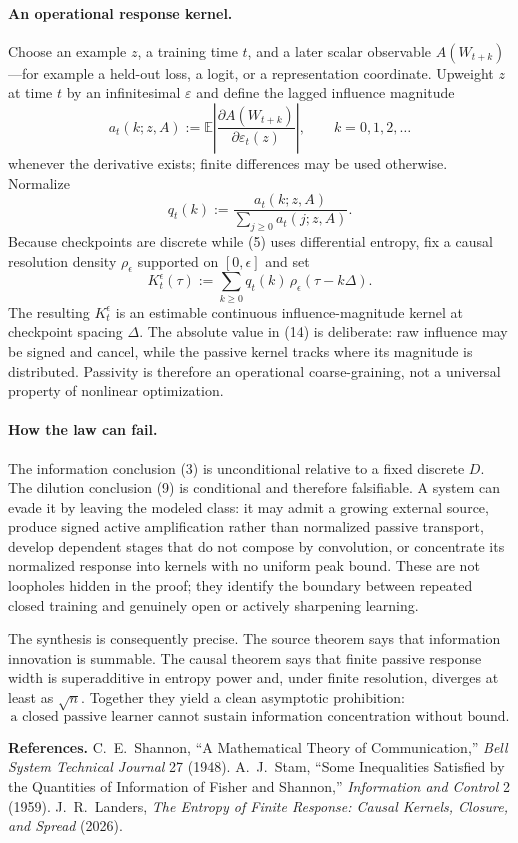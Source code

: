 \documentclass[10pt]{article}
\theoremstyle{compact}
\newcommand{\E}{\mathbb E}
\begin{document}
\paragraph{An operational response kernel.}
Choose an example $z$, a training time $t$, and a later scalar observable $A(W_{t+k})$---for example a held-out loss, a logit, or a representation coordinate. Upweight $z$ at time $t$ by an infinitesimal $\varepsilon$ and define the lagged influence magnitude
\[
a_t(k;z,A)
:=
\E\left|
\frac{\partial A(W_{t+k})}{\partial\varepsilon_t(z)}
\right|,
\qquad k=0,1,2,\ldots
\tag{14}
\]
whenever the derivative exists; finite differences may be used otherwise. Normalize
\[
q_t(k):=\frac{a_t(k;z,A)}{\sum_{j\ge0}a_t(j;z,A)}.
\tag{15}
\]
Because checkpoints are discrete while (5) uses differential entropy, fix a causal resolution density $\rho_\epsilon$ supported on $[0,\epsilon]$ and set
\[
K_t^{\epsilon}(\tau)
:=
\sum_{k\ge0}q_t(k)\,
\rho_\epsilon(\tau-k\Delta).
\tag{16}
\]
The resulting $K_t^{\epsilon}$ is an estimable continuous influence-magnitude kernel at checkpoint spacing $\Delta$. The absolute value in (14) is deliberate: raw influence may be signed and cancel, while the passive kernel tracks where its magnitude is distributed. Passivity is therefore an operational coarse-graining, not a universal property of nonlinear optimization.

\paragraph{How the law can fail.}
The information conclusion (3) is unconditional relative to a fixed discrete $D$. The dilution conclusion (9) is conditional and therefore falsifiable. A system can evade it by leaving the modeled class: it may admit a growing external source, produce signed active amplification rather than normalized passive transport, develop dependent stages that do not compose by convolution, or concentrate its normalized response into kernels with no uniform peak bound. These are not loopholes hidden in the proof; they identify the boundary between repeated closed training and genuinely open or actively sharpening learning.

The synthesis is consequently precise. The source theorem says that information innovation is summable. The causal theorem says that finite passive response width is superadditive in entropy power and, under finite resolution, diverges at least as $\sqrt n$. Together they yield a clean asymptotic prohibition:
\[
\boxed{
\text{a closed passive learner cannot sustain information concentration without bound.}}
\]

\vfill
{\footnotesize
\textbf{References.}
C.~E.~Shannon, ``A Mathematical Theory of Communication,'' \emph{Bell System Technical Journal} 27 (1948).
A.~J.~Stam, ``Some Inequalities Satisfied by the Quantities of Information of Fisher and Shannon,'' \emph{Information and Control} 2 (1959).
J.~R.~Landers, \emph{The Entropy of Finite Response: Causal Kernels, Closure, and Spread} (2026).
}
\end{document}
